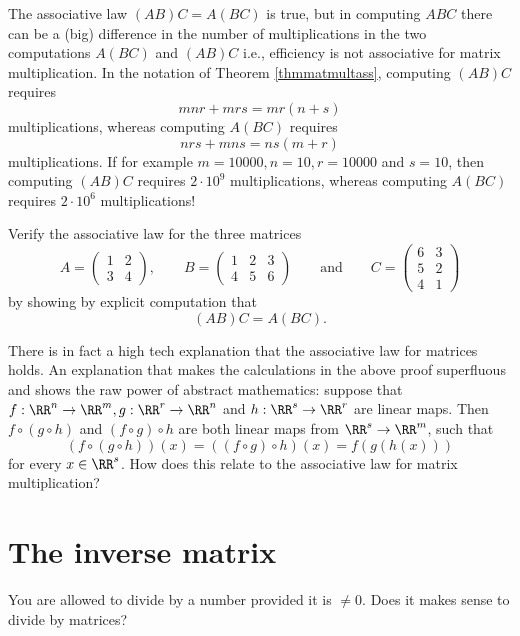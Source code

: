 \documentclass{article}
\begin{document}
\begin{frameit}
\begin{remark}
The associative law $(A B) C = A (B C)$ is true, but in computing $A B C$ there can be a (big)
difference in the number of multiplications in the two computations
$A (B C)$ and $(A B) C$ i.e., efficiency is not associative for
matrix multiplication. In the notation of Theorem \ref{thmmatmultass}, computing
$(A B) C$ requires
$$
m n r + m r s = m r (n + s)
$$
multiplications, whereas computing $A (B C)$ requires
$$
n r s  + m n s = n s (m + r)
$$
multiplications. If for example $m=10000, n = 10, r = 10000$ and $s = 10$, then computing
$(A B) C$ requires $2\cdot 10^9$ multiplications, whereas
computing $A (B C)$ requires $2\cdot 10^6$ multiplications!   
\end{remark}
\end{frameit}


\beginshex
Verify the associative law for the three matrices
$$
A =
\begin{pmatrix}
  1 & 2\\
  3 & 4
\end{pmatrix}, \qquad
B =
\begin{pmatrix}
  1 & 2 & 3\\
  4 & 5 & 6
\end{pmatrix}\qquad\text{and}\qquad
C =
\begin{pmatrix}
  6 & 3\\
  5 & 2\\
  4 & 1
\end{pmatrix}
$$
by showing by explicit computation that
$$
(A B) C = A (B C).
$$
\endshex

\beginshex
There is in fact a high tech explanation that the associative law for matrices holds. An explanation
that makes the calculations in the above proof superfluous and shows the raw power of
abstract mathematics: suppose that
$f: \RR^n\rightarrow \RR^m, g:\RR^r\rightarrow \RR^n$ and $h:\RR^s\rightarrow \RR^r$ are linear maps.
Then $f\circ (g\circ h)$ and $(f\circ g)\circ h$ are both linear maps from $\RR^s\rightarrow \RR^m$, such that
$$
(f\circ (g\circ h))(x) = ((f\circ g)\circ h)(x) = f( g ( h (x)))
$$
for every $x\in \RR^s$. How does this relate to the associative law for matrix
multiplication?
\endshex

\section{The inverse matrix}

You are allowed to divide by a number provided it is $\neq 0$. Does it makes sense
to divide by matrices?
\end{document}
